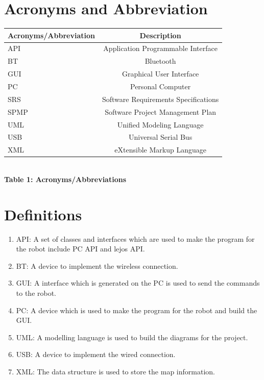 \documentclass[11pt, a4paper]{report}
\begin{document}
\section{Acronyms and Abbreviation}
\begin{center}
\begin{tabular}{|l|c|}
  \hline
  \textbf{Acronyms/Abbreviation} & \textbf{Description}\\
  \hline
  API		& Application Programmable Interface \\
  \hline
  BT		& Bluetooth \\
  \hline
  GUI		& Graphical User Interface \\
  \hline
  PC		& Personal Computer\\
  \hline
  SRS	& Software Requirements Specifications \\
  \hline
  SPMP 	& Software Project Management Plan \\
  \hline
  UML	& Unified Modeling Language\\
  \hline
  USB	& Universal Serial Bus\\
  \hline
  XML 	& eXtensible Markup Language \\
  \hline
\end{tabular} \\[0.3cm]
\textbf {Table 1: Acronyms/Abbreviations} \\[0.3cm]
\end{center}
\section{Definitions}
\begin{enumerate}
\item API: A set of classes and interfaces which are used to make the program for the robot include PC API and lejos API.\\
\item BT: A device to implement the wireless connection.\\
\item GUI: A interface which is generated on the PC is used to send the commands to the robot.\\
\item PC: A device which is used to make the program for the robot and build the GUI.\\
\item UML: A modelling language is used to build the diagrams for the project.\\
\item USB: A device to implement the wired connection.\\
\item XML: The data structure is used to store the map information.\\ 
\end{enumerate}
\pagebreak
\newpage
\appendix

\pagebreak
\end{document}

